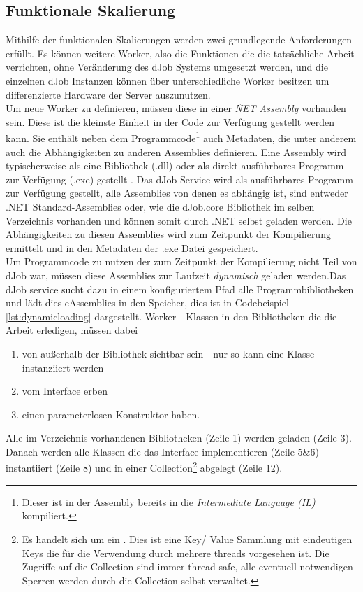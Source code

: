 \subsection{Funktionale Skalierung} \label{sec:dynload}
Mithilfe der funktionalen Skalierungen werden zwei grundlegende Anforderungen erfüllt. Es können weitere Worker, also die Funktionen die die tatsächliche Arbeit verrichten, ohne Veränderung des dJob Systems umgesetzt werden, und die einzelnen dJob Instanzen können über unterschiedliche Worker besitzen um differenzierte Hardware der Server auszunutzen.
\\Um neue Worker zu definieren, müssen diese in einer \emph{\.NET Assembly} vorhanden sein. 
Diese ist die kleinste Einheit in der Code zur Verfügung gestellt werden kann. Sie enthält neben dem Programmcode\footnote{Dieser ist in der Assembly bereits in die \emph{Intermediate Language (IL)} kompiliert.} auch Metadaten, die unter anderem auch die Abhängigkeiten zu anderen Assemblies definieren. Eine Assembly wird typischerweise als eine Bibliothek (.dll) oder als direkt ausführbares Programm zur Verfügung (.exe) gestellt \parencite[S. 17ff]{box}. Das dJob Service wird als ausführbares Programm zur Verfügung gestellt, alle Assemblies von denen es abhängig ist, sind entweder .NET Standard-Assemblies oder, wie die dJob.core Bibliothek im selben Verzeichnis vorhanden und können somit durch .NET selbst geladen werden. Die Abhängigkeiten zu diesen Assemblies wird zum Zeitpunkt der Kompilierung ermittelt und in den Metadaten der .exe Datei gespeichert.
\\Um Programmcode zu nutzen der zum Zeitpunkt der Kompilierung nicht Teil von dJob war, müssen diese Assemblies zur Laufzeit \emph{dynamisch} geladen werden.Das dJob service sucht dazu in einem konfiguriertem Pfad alle Programmbibliotheken und lädt dies eAssemblies in den Speicher, dies ist in Codebeispiel \ref{lst:dynamicloading} dargestellt. 
Worker - Klassen in den Bibliotheken die die Arbeit erledigen, müssen dabei \begin{enumerate}
	\item von außerhalb der Bibliothek sichtbar sein - nur so kann eine Klasse instanziiert werden
	\item vom Interface  erben
	\item einen parameterlosen Konstruktor haben.
\end{enumerate}
Alle im Verzeichnis vorhandenen Bibliotheken (Zeile 1) werden geladen (Zeile 3). Danach werden alle Klassen die das Interface  implementieren (Zeile 5\&6) instantiiert (Zeile 8) und in einer Collection\footnote{Es handelt sich um ein . Dies ist eine Key/ Value Sammlung mit eindeutigen Keys die für die Verwendung durch mehrere threads vorgesehen ist. Die Zugriffe auf die Collection sind immer thread-safe, alle eventuell notwendigen Sperren werden durch die Collection selbst verwaltet.} abgelegt (Zeile 12).

